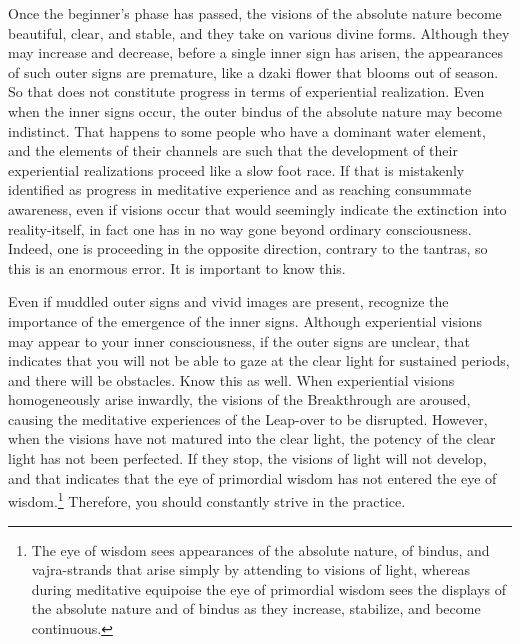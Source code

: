 \documentclass[11pt,twocolumn]{article}
\begin{document}
Once the beginner's phase has passed, the visions of the absolute
nature become beautiful, clear, and stable, and they take on various
divine forms. Although they may increase and decrease, before a single
inner sign has arisen, the appearances of such outer signs are
premature, like a dzaki flower that blooms out of season. So that does
not constitute progress in terms of experiential realization. Even
when the inner signs occur, the outer bindus of the absolute nature
may become indistinct. That happens to some people who have a dominant
water element, and the elements of their channels are such that the
development of their experiential realizations proceed like a slow
foot race. If that is mistakenly identified as progress in meditative
experience and as reaching consummate awareness, even if visions occur
that would seemingly indicate the extinction into reality\hyp{}itself,
in fact one has in no way gone beyond ordinary consciousness. Indeed,
one is proceeding in the opposite direction, contrary to the tantras,
so this is an enormous error. It is important to know this.

Even if muddled outer signs and vivid images are present, recognize
the importance of the emergence of the inner signs. Although
experiential visions may appear to your inner consciousness, if the
outer signs are unclear, that indicates that you will not be able to
gaze at the clear light for sustained periods, and there will be
obstacles. Know this as well. When experiential visions homogeneously
arise inwardly, the visions of the Breakthrough are aroused, causing
the meditative experiences of the Leap\hyp{}over to be
disrupted. However, when the visions have not matured into the clear
light, the potency of the clear light has not been perfected. If they
stop, the visions of light will not develop, and that indicates that
the eye of primordial wisdom has not entered the eye of
wisdom.\footnote{The eye of wisdom sees appearances of the absolute
  nature, of bindus, and vajra\hyp{}strands that arise simply by
  attending to visions of light, whereas during meditative equipoise
  the eye of primordial wisdom sees the displays of the absolute
  nature and of bindus as they increase, stabilize, and become
  continuous.} Therefore, you should constantly strive in the
practice.
\end{document}
